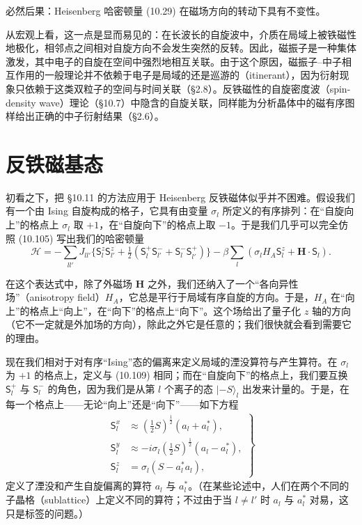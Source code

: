 必然后果：Heisenberg 哈密顿量 (10.29) 在磁场方向的转动下具有不变性。

从宏观上看，这一点是显而易见的：在长波长的自旋波中，介质在局域上被铁磁性地极化，相邻点之间相对自旋方向不会发生突然的反转。因此，磁振子是一种集体激发，其中电子的自旋在空间中强烈地相互关联。由于这个原因，磁振子–中子相互作用的一般理论并不依赖于电子是局域的还是巡游的（itinerant），因为衍射现象只依赖于这类双粒子的空间与时间关联（§2.8）。反铁磁性的自旋密度波（spin-density wave）理论（§10.7）中隐含的自旋关联，同样能为分析晶体中的磁有序图样给出正确的中子衍射结果（§2.6）。

\section{反铁磁基态}

初看之下，把 §10.11 的方法应用于 Heisenberg 反铁磁体似乎并不困难。假设我们有一个由 Ising 自旋构成的格子，它具有由变量 $\sigma_l$ 所定义的有序排列：在“自旋向上”的格点上 $\sigma_l$ 取 $+1$，在“自旋向下”的格点上取 $-1$。于是我们几乎可以完全仿照 (10.105) 写出我们的哈密顿量
\begin{equation*}
\mathcal{H} = -\sum_{ll'} J_{ll'} \bigl\{ \mathsf{S}_l^z \mathsf{S}_{l'}^z + \tfrac{1}{2}(\mathsf{S}_l^+ \mathsf{S}_{l'}^- + \mathsf{S}_l^- \mathsf{S}_{l'}^+) \bigr\} - \beta \sum_l (\sigma_l H_A \mathsf{S}_l^z + \mathbf{H}\cdot\mathsf{S}_l). \tag{10.124}
\end{equation*}

在这个表达式中，除了外磁场 $\mathbf{H}$ 之外，我们还纳入了一个“各向异性场”（anisotropy field）$H_A$，它总是平行于局域有序自旋的方向。于是，$H_A$ 在“向上”的格点上“向上”，在“向下”的格点上“向下”。这个场给出了量子化 $z$ 轴的方向（它不一定就是外加场的方向），除此之外它是任意的；我们很快就会看到需要它的理由。

现在我们相对于对有序“Ising”态的偏离来定义局域的湮没算符与产生算符。在 $\sigma_l$ 为 $+1$ 的格点上，定义与 (10.109) 相同；而在“自旋向下”的格点上，我们要互换 $\mathsf{S}_l^+$ 与 $\mathsf{S}_l^-$ 的角色，因为我们是从第 $l$ 个离子的态 $|{-S}\rangle_l$ 出发来计量的。于是，在每一个格点上——无论“向上”还是“向下”——如下方程
\begin{align*}
\left.
\begin{aligned}
\mathsf{S}_l^x &\approx (\tfrac{1}{2}S)^{\frac{1}{2}}(a_l + a_l^*), \\
\mathsf{S}_l^y &\approx -i\sigma_l (\tfrac{1}{2}S)^{\frac{1}{2}}(a_l - a_l^*), \\
\mathsf{S}_l^z &= \sigma_l (S - a_l^* a_l),
\end{aligned}
\right\} \tag{10.125}
\end{align*}
定义了湮没和产生自旋偏离的算符 $a_l$ 与 $a_l^*$。（在某些论述中，人们在两个不同的子晶格（sublattice）上定义不同的算符；不过由于当 $l \neq l'$ 时 $a_l$ 与 $a_l^*$ 对易，这只是标签的问题。）

